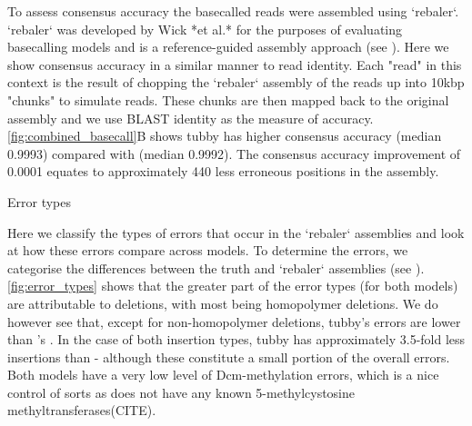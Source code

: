 To assess consensus accuracy the basecalled reads were assembled using `rebaler`. `rebaler` was developed by Wick *et al.* for the purposes of evaluating basecalling models and is a reference-guided assembly approach (see ). Here we show consensus accuracy in a similar manner to read identity. Each "read" in this context is the result of chopping the `rebaler` assembly of the reads up into 10kbp "chunks" to simulate reads. These chunks are then mapped back to the original assembly and we use BLAST identity as the measure of accuracy. \autoref{fig:combined_basecall}B shows tubby has higher consensus accuracy (median 0.9993) compared with \guppy{} (median 0.9992). The consensus accuracy improvement of 0.0001 equates to approximately 440 less erroneous positions in the \mtb{} assembly.

Error types

Here we classify the types of errors that occur in the `rebaler` assemblies and look at how these errors compare across models. To determine the errors, we categorise the differences between the truth and `rebaler` assemblies (see ). \autoref{fig:error_types} shows that the greater part of the error types (for both models) are attributable to deletions, with most being homopolymer deletions. We do however see that, except for non-homopolymer deletions, tubby's errors are lower than \guppy{}'s . In the case of both insertion types, tubby has approximately 3.5-fold less insertions than \guppy{} - although these constitute a small portion of the overall errors. Both models have a very low level of Dcm-methylation errors, which is a nice control of sorts as \mtb{} does not have any known 5-methylcystosine methyltransferases(CITE).


